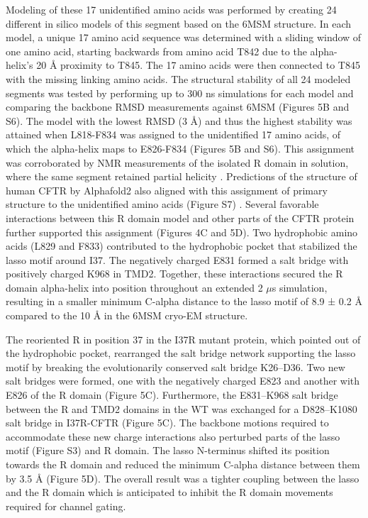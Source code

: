 Modeling of these 17 unidentified amino acids was performed by creating 24 different in silico models of this segment based on the 6MSM structure. In each model, a unique 17 amino acid sequence was determined with a sliding window of one amino acid, starting backwards from amino acid T842 due to the alpha-helix’s 20 $\mbox{\AA}$ proximity to T845. The 17 amino acids were then connected to T845 with the missing linking amino acids. The structural stability of all 24 modeled segments was tested by performing up to 300 ns simulations for each model and comparing the backbone RMSD measurements against 6MSM (Figures 5B and S6). The model with the lowest RMSD (3 $\mbox{\AA}$) and thus the highest stability was attained when L818-F834 was assigned to the unidentified 17 amino acids, of which the alpha-helix maps to E826-F834 (Figures 5B and S6). This assignment was corroborated by NMR measurements of the isolated R domain in solution, where the same segment retained partial helicity \cite{baker2007}. Predictions of the structure of human CFTR by Alphafold2 also aligned with this assignment of primary structure to the unidentified amino acids (Figure S7) \cite{jumper2021}. Several favorable interactions between this R domain model and other parts of the CFTR protein further supported this assignment (Figures 4C and 5D). Two hydrophobic amino acids (L829 and F833) contributed to the hydrophobic pocket that stabilized the lasso motif around I37. The negatively charged E831 formed a salt bridge with positively charged K968 in TMD2. Together, these interactions secured the R domain alpha-helix into position throughout an extended 2 $\mu$s simulation, resulting in a smaller minimum C-alpha distance to the lasso motif of 8.9 ± 0.2 $\mbox{\AA}$ compared to the 10 $\mbox{\AA}$ in the 6MSM cryo-EM structure.

The reoriented R in position 37 in the I37R mutant protein, which pointed out of the hydrophobic pocket, rearranged the salt bridge network supporting the lasso motif by breaking the evolutionarily conserved salt bridge K26–D36. Two new salt bridges were formed, one with the negatively charged E823 and another with E826 of the R domain (Figure 5C). Furthermore, the E831–K968 salt bridge between the R and TMD2 domains in the WT was exchanged for a D828–K1080 salt bridge in I37R-CFTR (Figure 5C). The backbone motions required to accommodate these new charge interactions also perturbed parts of the lasso motif (Figure S3) and R domain. The lasso N-terminus shifted its position towards the R domain and reduced the minimum C-alpha distance between them by 3.5 $\mbox{\AA}$ (Figure 5D). The overall result was a tighter coupling between the lasso and the R domain which is anticipated to inhibit the R domain movements required for channel gating.

